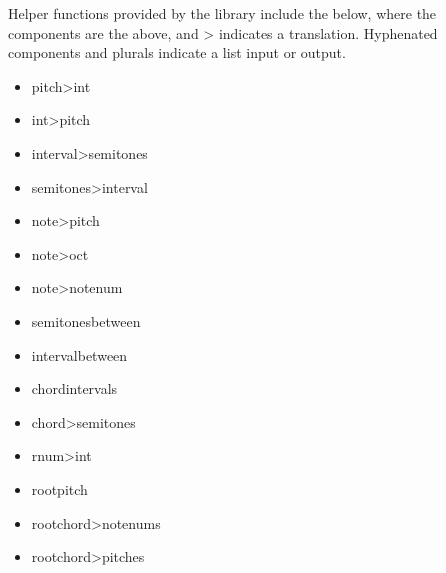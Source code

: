 \documentclass[letterpaper,10pt,english]{sphinxmanual}
\begin{document}
\sphinxAtStartPar
Helper functions provided by the library include the below,
where the components are the above, and \sphinxhyphen{}\textgreater{} indicates a translation.
Hyphenated components and plurals indicate a list input or output.
\begin{itemize}
\item {} 
\sphinxAtStartPar
pitch\sphinxhyphen{}\textgreater{}int

\item {} 
\sphinxAtStartPar
int\sphinxhyphen{}\textgreater{}pitch

\item {} 
\sphinxAtStartPar
interval\sphinxhyphen{}\textgreater{}semitones

\item {} 
\sphinxAtStartPar
semitones\sphinxhyphen{}\textgreater{}interval

\item {} 
\sphinxAtStartPar
note\sphinxhyphen{}\textgreater{}pitch

\item {} 
\sphinxAtStartPar
note\sphinxhyphen{}\textgreater{}oct

\item {} 
\sphinxAtStartPar
note\sphinxhyphen{}\textgreater{}note\sphinxhyphen{}num

\item {} 
\sphinxAtStartPar
semitones\sphinxhyphen{}between

\item {} 
\sphinxAtStartPar
interval\sphinxhyphen{}between

\item {} 
\sphinxAtStartPar
chord\sphinxhyphen{}intervals

\item {} 
\sphinxAtStartPar
chord\sphinxhyphen{}\textgreater{}semitones

\item {} 
\sphinxAtStartPar
rnum\sphinxhyphen{}\textgreater{}int

\item {} 
\sphinxAtStartPar
root\sphinxhyphen{}pitch

\item {} 
\sphinxAtStartPar
root\sphinxhyphen{}chord\sphinxhyphen{}\textgreater{}note\sphinxhyphen{}nums

\item {} 
\sphinxAtStartPar
root\sphinxhyphen{}chord\sphinxhyphen{}\textgreater{}pitches

\end{itemize}
\end{document}
